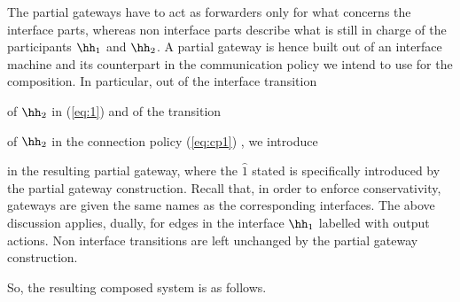 The partial gateways have to act as forwarders only for what concerns the interface parts,
whereas non interface parts describe what is still in charge of the participants $\hh_1$ and $\hh_2$.
A partial gateway is hence built out of an interface machine and its counterpart in the
communication policy we intend to use for the composition. 
 \vspace{-1mm} In particular, out of the interface transition
\raisebox{2mm}
{
 } 
 of $\hh_2$ in (\ref{eq:1}) and of the transition
 \raisebox{2mm}
{
 }  
 of $\hh_2$ in the connection policy (\ref{eq:cp1}) , we introduce 
  \raisebox{2mm}
{
 }
in the resulting partial gateway, where the $\widehat 1$ stated is specifically introduced 
by the partial gateway construction.
Recall that, in order to enforce conservativity, gateways are given the same names as the
corresponding interfaces.
The above discussion applies, dually, for edges in the interface $\hh_1$ labelled with output actions.
Non interface transitions are left unchanged by the partial gateway construction.



So, the resulting composed system is as follows.

